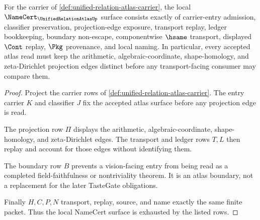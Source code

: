 \begin{theorem}
\label{thm:unified-relation-atlas-projection-obligations}
For the carrier of \autoref{def:unified-relation-atlas-carrier}, the local $\NameCert_{\UnifiedRelationAtlasUp}$ surface consists exactly of carrier-entry admission, classifier preservation, projection-edge exposure, transport replay, ledger bookkeeping, boundary non-escape, componentwise $\hsame$ transport, displayed $\Cont$ replay, $\Pkg$ provenance, and local naming. In particular, every accepted atlas read must keep the arithmetic, algebraic-coordinate, shape-homology, and zeta-Dirichlet projection edges distinct before any transport-facing consumer may compare them.
\end{theorem}
\begin{proof}
Project the carrier rows of \autoref{def:unified-relation-atlas-carrier}. The entry carrier $K$ and classifier $J$ fix the accepted atlas surface before any projection edge is read.

The projection row $\Pi$ displays the arithmetic, algebraic-coordinate, shape-homology, and zeta-Dirichlet edges. The transport and ledger rows $T,L$ then replay and account for those edges without identifying them.

The boundary row $B$ prevents a vision-facing entry from being read as a completed field-faithfulness or nontriviality theorem. It is an atlas boundary, not a replacement for the later TasteGate obligations.

Finally $H,C,P,N$ transport, replay, source, and name exactly the same finite packet. Thus the local NameCert surface is exhausted by the listed rows.
\end{proof}

